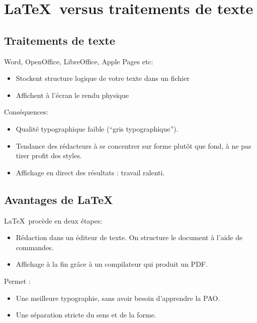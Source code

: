 \section[\LaTeX]{\LaTeX\ versus traitements de texte}

\subsection{Traitements de texte}
\begin{slide}

Word, OpenOffice, LibreOffice, Apple Pages etc:

\begin{itemize}
  \item Stockent structure logique de votre texte dans un fichier
  \item Affichent à l'écran le rendu physique
\end{itemize}

\end{slide}

\begin{slide}
Conséquences:
\begin{itemize}
  \item Qualité typographique faible (\enquote{gris typographique}).
  \item Tendance des rédacteurs à se concentrer sur forme plutôt que fond, à ne pas tirer profit des styles.
  \item Affichage en direct des résultats :  travail ralenti.

\end{itemize}
\end{slide}

\subsection{Avantages de \LaTeX}
\begin{slide}
\LaTeX\ procède en deux étapes:

\begin{itemize}
  \item Rédaction dans un éditeur de texte. On structure le document à l'aide de commandes.
  \item Affichage à la fin grâce à un compilateur qui produit un PDF.
\end{itemize}

\end{slide}
\begin{slide}
  Permet :
  \begin{itemize}
    \item Une meilleure typographie, sans avoir besoin d'apprendre la PAO.
    \item Une séparation stricte du sens et de la forme.
  \end{itemize}
\end{slide}

